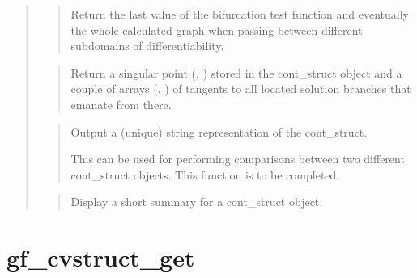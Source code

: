\documentclass[a4paper,11pt,english]{sphinxmanual}
\begin{document}
\begin{quote}
\sphinxAtStartPar
{}
\begin{quote}

\sphinxAtStartPar
Return the last value of the bifurcation test function and eventually
the whole calculated graph when passing between different sub\sphinxhyphen{}domains
of differentiability.
\end{quote}

\sphinxAtStartPar
{}
\begin{quote}

\sphinxAtStartPar
Return a singular point (, ) stored in the cont\_struct object and a
couple of arrays (, ) of tangents to all located solution
branches that emanate from there.
\end{quote}

\sphinxAtStartPar
{}
\begin{quote}

\sphinxAtStartPar
Output a (unique) string representation of the cont\_struct.

\sphinxAtStartPar
This can be used for performing comparisons between two
different cont\_struct objects.
This function is to be completed.
\end{quote}

\sphinxAtStartPar
{}
\begin{quote}

\sphinxAtStartPar
Display a short summary for a cont\_struct object.
\end{quote}
\end{quote}


\section{gf\_cvstruct\_get}
\label{\detokenize{matlab_octave/cmdref_gf_cvstruct_get:gf-cvstruct-get}}\label{\detokenize{matlab_octave/cmdref_gf_cvstruct_get::doc}}
\sphinxAtStartPar
{}
\end{document}
